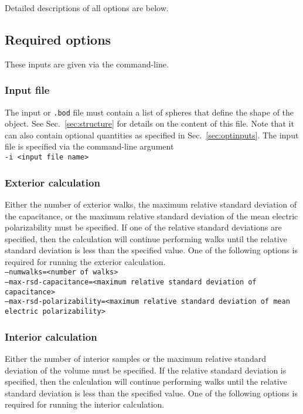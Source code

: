 \documentclass[12pt,letterpaper]{article}
\begin{document}
\noindent Detailed descriptions of all options are below.

\subsection{Required options}
These inputs are given via the command-line. 

\subsubsection{Input file}
The input or \texttt{.bod} file must contain a list of spheres that define the shape of the object. See Sec.~\ref{sec:structure} for details on the content of this file. Note that it can also contain optional quantities as specified in Sec.~\ref{sec:optinputs}. The input file is specified via the command-line argument\\ 

\texttt{-i <input file name>}

\subsubsection{Exterior calculation}
Either the number of exterior walks, the maximum relative standard deviation of the capacitance, or the maximum relative standard deviation of the mean electric polarizability must be specified. If one of the relative standard deviations are specified, then the calculation will continue performing walks until the relative standard deviation is less than the specified value. One of the following options is required for running the exterior calculation. \\

\indent \texttt{--numwalks=<number of walks>} \\
\indent \texttt{--max-rsd-capacitance=<maximum relative standard deviation of capacitance>} \\
\indent \texttt{--max-rsd-polarizability=<maximum relative standard deviation of mean electric polarizability>}

\subsubsection{Interior calculation}
Either the number of interior samples or the maximum relative standard deviation of the volume must be specified. If the relative standard deviation is specified, then the calculation will continue performing walks until the relative standard deviation is less than the specified value. One of the following options is required for running the interior calculation.  \\
\end{document}
